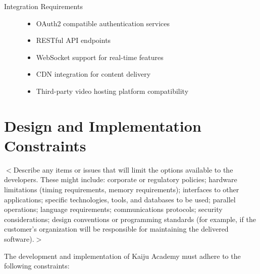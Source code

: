 \documentclass[a4paper, 11pt]{scrreprt}
\begin{document}
\begin{description}
    \item[Integration Requirements]
        \begin{itemize}
            \item OAuth2 compatible authentication services
            \item RESTful API endpoints
            \item WebSocket support for real-time features
            \item CDN integration for content delivery
            \item Third-party video hosting platform compatibility
        \end{itemize}
\end{description}

\section{Design and Implementation Constraints}
$<$Describe any items or issues that will limit the options available to the 
developers. These might include: corporate or regulatory policies; hardware 
limitations (timing requirements, memory requirements); interfaces to other 
applications; specific technologies, tools, and databases to be used; parallel 
operations; language requirements; communications protocols; security 
considerations; design conventions or programming standards (for example, if the 
customer's organization will be responsible for maintaining the delivered 
software).$>$

The development and implementation of Kaiju Academy must adhere to the following constraints:
\end{document}
